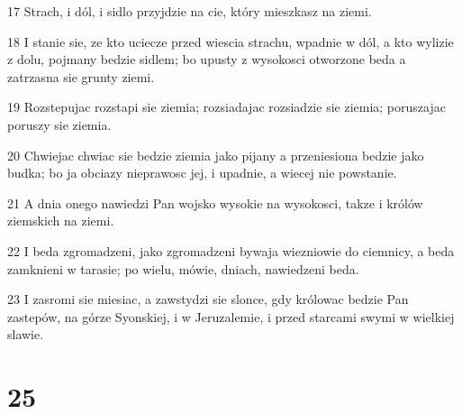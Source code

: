 \par 17 Strach, i dól, i sidlo przyjdzie na cie, który mieszkasz na ziemi.
\par 18 I stanie sie, ze kto uciecze przed wiescia strachu, wpadnie w dól, a kto wylizie z dolu, pojmany bedzie sidlem; bo upusty z wysokosci otworzone beda a zatrzasna sie grunty ziemi.
\par 19 Rozstepujac rozstapi sie ziemia; rozsiadajac rozsiadzie sie ziemia; poruszajac poruszy sie ziemia.
\par 20 Chwiejac chwiac sie bedzie ziemia jako pijany a przeniesiona bedzie jako budka; bo ja obciazy nieprawosc jej, i upadnie, a wiecej nie powstanie.
\par 21 A dnia onego nawiedzi Pan wojsko wysokie na wysokosci, takze i królów ziemskich na ziemi.
\par 22 I beda zgromadzeni, jako zgromadzeni bywaja wiezniowie do ciemnicy, a beda zamknieni w tarasie; po wielu, mówie, dniach, nawiedzeni beda.
\par 23 I zasromi sie miesiac, a zawstydzi sie slonce, gdy królowac bedzie Pan zastepów, na górze Syonskiej, i w Jeruzalemie, i przed starcami swymi w wielkiej slawie.

\chapter{25}

